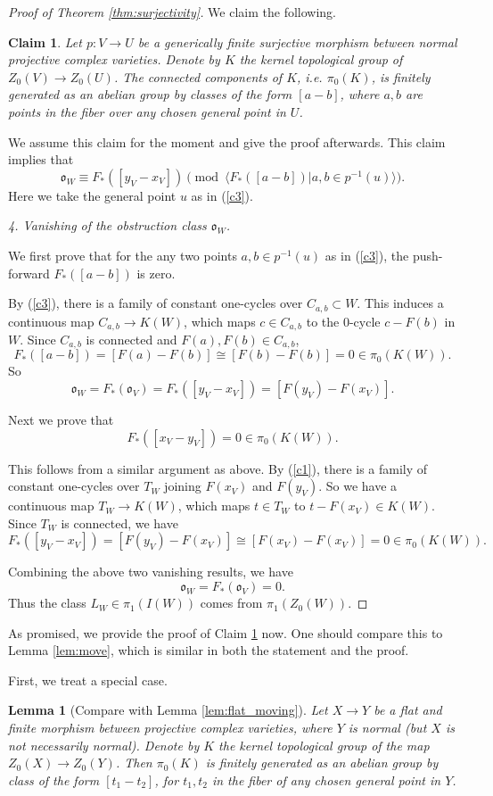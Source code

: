\documentclass{amsart}
\newtheorem{lem}[theorem]{Lemma}
\newtheorem{claim}[theorem]{Claim}
\theoremstyle{definition}
\theoremstyle{remark}
\begin{document}
\begin{proof}[Proof of Theorem \ref{thm:surjectivity}]
We claim the following.
\begin{claim}\label{claim:pi_0}
     Let $p: V \to U$ be a generically finite surjective morphism between normal projective complex varieties. Denote by $K$ the kernel topological group of $Z_0(V) \to Z_0(U)$. The connected components of $K$, i.e. $\pi_0(K)$, is finitely generated as an abelian group by classes of the form $[a-b]$, where $a, b$ are points in the fiber over any chosen general point in $U$.
\end{claim} 

We assume this claim for the moment and give the proof afterwards.
This claim implies that 
\[
\mathfrak{o}_W\equiv F_*([y_V-x_V]) \pmod{\langle F_*([a-b])| a, b \in p^{-1}(u)\rangle}.
\]
Here we take the general point $u$ as in (\ref{c3}).

\textit{4. Vanishing of the obstruction class $\mathfrak{o}_W$.}

 We first prove that for the any two points $a, b \in p^{-1}(u)$ as in (\ref{c3}), the push-forward $F_*([a-b])$ is zero. 
 
By (\ref{c3}), there is a family of constant one-cycles over $C_{a, b}\subset W$. 
This induces a continuous map $C_{a, b} \to K(W)$, which maps $c \in C_{a, b}$ to the  $0$-cycle $c-F(b)$ in $W$.  
Since $C_{a, b}$ is connected and $F(a), F(b)\in C_{a, b}$,
\[
F_*([a-b])=[F(a)-F(b)]\cong [F(b)-F(b)]=0 \in \pi_0(K(W)).
\]
So $$\mathfrak{o}_W=F_*(\mathfrak{o}_V)=F_*([y_V-x_V])=[F(y_V)-F(x_V)].$$

 Next we prove that $$F_*([x_V-y_V])=0 \in \pi_0(K(W)).$$
 
 This follows from a similar argument as above. By (\ref{c1}), there is a family of constant one-cycles over $T_W$ joining $F(x_V)$ and $F(y_V)$.   
So we have a continuous map $T_W \to K(W)$, which maps $t \in T_W$ to $t-F(x_V) \in K(W)$.
Since $T_W$ is connected, we have
\[
F_*([y_V-x_V])=[F(y_V)-F(x_V)]\cong [F(x_V)-F(x_V)]=0 \in \pi_0(K(W)).
\]

Combining the above two vanishing results, we have $$\mathfrak{o}_W=F_*(\mathfrak{o}_V)=0.$$
Thus the class $L_W\in \pi_1(I(W))$ comes from $\pi_1(Z_0(W))$.
\end{proof}
As promised, we provide the proof of Claim \ref{claim:pi_0} now. One should compare this to Lemma \ref{lem:move}, which is similar in both the statement and the proof.

First, we treat a special case.
\begin{lem}[Compare with Lemma \ref{lem:flat_moving}]\label{lem:easy_pi_0}
    Let $X \to Y$ be a flat and finite morphism between projective complex varieties, where $Y$ is normal (but $X$ is not necessarily normal). 
Denote by $K$ the kernel topological group of the map $Z_0(X) \to Z_0(Y)$.
Then $\pi_0(K)$ is finitely generated as an abelian group by class of the form $[t_1-t_2]$, for $t_1, t_2$ in the fiber of any chosen general point in $Y$.
\end{lem}
\end{document}
